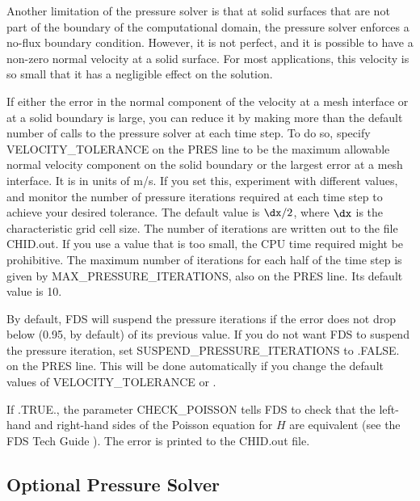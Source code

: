 \documentclass[11pt]{book}
\begin{document}
Another limitation of the pressure solver is that at solid surfaces that are not part of the boundary of the computational domain, the pressure solver enforces a no-flux boundary condition. However, it is not perfect, and it is possible to have a non-zero normal velocity at a solid surface. For most applications, this velocity is so small that it has a negligible effect on the solution.

If either the error in the normal component of the velocity at a mesh interface or at a solid boundary is large, you can reduce it by making more than the default number of calls to the pressure solver at each time step. To do so, specify {\ct VELOCITY\_TOLERANCE} on the {\ct PRES} line to be the maximum allowable normal velocity component on the solid boundary or the largest error at a mesh interface. It is in units of m/s. If you set this, experiment with different values, and monitor the number of pressure iterations required at each time step to achieve your desired tolerance. The default value is $\dx/2$, where $\dx$ is the characteristic grid cell size. The number of iterations are written out to the file {\ct CHID.out}. If you use a value that is too small, the CPU time required might be prohibitive. The maximum number of iterations for each half of the time step is given by {\ct MAX\_PRESSURE\_ITERATIONS}, also on the {\ct PRES} line. Its default value is 10.

By default, FDS will suspend the pressure iterations if the error does not drop below  (0.95, by default) of its previous value. If you do not want FDS to suspend the pressure iteration, set {\ct SUSPEND\_PRESSURE\_ITERATIONS} to {\ct .FALSE.} on the {\ct PRES} line. This will be done automatically if you change the default values of {\ct VELOCITY\_TOLERANCE} or .


If {\ct .TRUE.}, the parameter {\ct CHECK\_POISSON} tells FDS to check that the left-hand and right-hand sides of the Poisson equation for $H$ are equivalent (see the FDS Tech Guide \cite{FDS_Math_Guide}).  The error is printed to the {\ct CHID.out} file.


\subsection*{Optional Pressure Solver}
\end{document}
